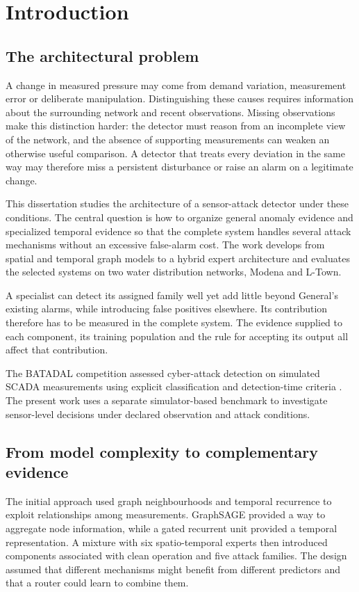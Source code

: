 \chapter{Introduction}
\label{ch:introduction}

\section{The architectural problem}
A change in measured pressure may come from demand variation, measurement error or deliberate manipulation. Distinguishing these causes requires information about the surrounding network and recent observations. Missing observations make this distinction harder: the detector must reason from an incomplete view of the network, and the absence of supporting measurements can weaken an otherwise useful comparison. A detector that treats every deviation in the same way may therefore miss a persistent disturbance or raise an alarm on a legitimate change.

This dissertation studies the architecture of a sensor-attack detector under these conditions. The central question is how to organize general anomaly evidence and specialized temporal evidence so that the complete system handles several attack mechanisms without an excessive false-alarm cost. The work develops from spatial and temporal graph models to a hybrid expert architecture and evaluates the selected systems on two water distribution networks, Modena and L-Town.

A specialist can detect its assigned family well yet add little beyond General's existing alarms, while introducing false positives elsewhere. Its contribution therefore has to be measured in the complete system. The evidence supplied to each component, its training population and the rule for accepting its output all affect that contribution.

The BATADAL competition assessed cyber-attack detection on simulated SCADA measurements using explicit classification and detection-time criteria \cite{batadal}. The present work uses a separate simulator-based benchmark to investigate sensor-level decisions under declared observation and attack conditions.

\section{From model complexity to complementary evidence}
The initial approach used graph neighbourhoods and temporal recurrence to exploit relationships among measurements. GraphSAGE provided a way to aggregate node information, while a gated recurrent unit provided a temporal representation. A mixture with six spatio-temporal experts then introduced components associated with clean operation and five attack families. The design assumed that different mechanisms might benefit from different predictors and that a router could learn to combine them.

